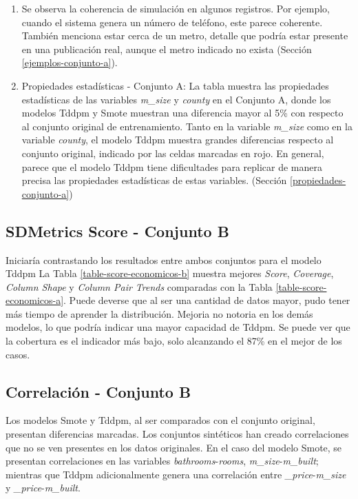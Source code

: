 \begin{enumerate}
    \item Se observa la coherencia de simulación en algunos registros. Por ejemplo, cuando el sistema genera un número de teléfono, este parece coherente. También menciona estar cerca de un metro, detalle que podría estar presente en una publicación real, aunque el metro indicado no exista (Sección \ref{ejemplos-conjunto-a}).
    
    \item Propiedades estadísticas - Conjunto A: La tabla muestra las propiedades estadísticas de las variables \emph{m\_size} y \emph{county} en el Conjunto A, donde los modelos Tddpm y Smote muestran una diferencia mayor al 5\% con respecto al conjunto original de entrenamiento. Tanto en la variable \emph{m\_size} como en la variable \emph{county}, el modelo Tddpm muestra grandes diferencias respecto al conjunto original, indicado por las celdas marcadas en rojo. En general, parece que el modelo Tddpm tiene dificultades para replicar de manera precisa las propiedades estadísticas de estas variables. (Sección \ref{propiedades-conjunto-a})
    
\end{enumerate}


\newpage
\subsection{SDMetrics Score - Conjunto B}
\label{ds-conjunto-b}
Iniciaría contrastando los resultados entre ambos conjuntos para el modelo Tddpm La Tabla \ref{table-score-economicos-b} muestra mejores \emph{Score}, \emph{Coverage}, \emph{Column Shape} y \emph{Column Pair Trends} comparadas con la Tabla \ref{table-score-economicos-a}. Puede deverse que al ser una cantidad de datos mayor, pudo tener más tiempo de aprender la distribución. Mejoria no notoria en los demás modelos, lo que podría indicar una mayor capacidad de Tddpm. Se puede ver que la cobertura es el indicador más bajo, solo alcanzando el 87\% en el mejor de los casos.



\newpage
\subsection{Correlación - Conjunto B}
\label{correlacion-conjunto-b}
Los modelos Smote y Tddpm, al ser comparados con el conjunto original, presentan diferencias marcadas. Los conjuntos sintéticos han creado correlaciones que no se ven presentes en los datos originales. En el caso del modelo Smote, se presentan correlaciones en las variables \emph{bathrooms}-\emph{rooms}, \emph{m\_size}-\emph{m\_built}; mientras que Tddpm adicionalmente genera una correlación entre \emph{\_price}-\emph{m\_size} y \emph{\_price}-\emph{m\_built}.


